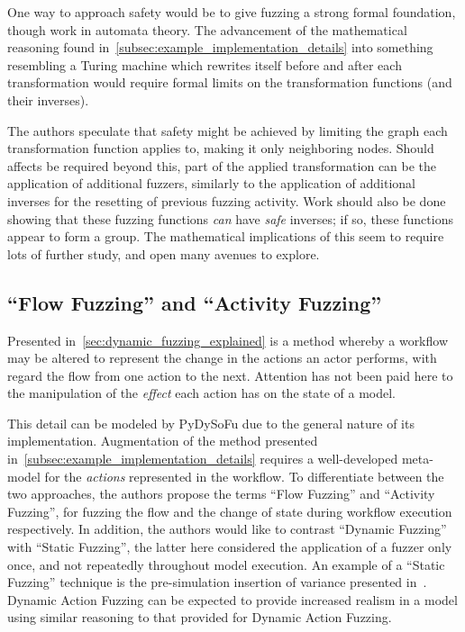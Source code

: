 \documentclass[12pt]{llncs}  %
\begin{document}
One way to approach safety would be to give fuzzing a strong formal foundation,
though work in automata theory. The advancement of the mathematical reasoning
found in~\cref{subsec:example_implementation_details} into something resembling
a Turing machine which rewrites itself before and after each transformation
would require formal limits on the transformation functions (and their
inverses).

The authors speculate that safety might be achieved by limiting the graph each
transformation function applies to, making it only neighboring nodes. Should
affects be required beyond this, part of the applied transformation can be the
application of additional fuzzers, similarly to the application of additional
inverses for the resetting of previous fuzzing activity. Work should also be
done showing that these fuzzing functions \emph{can} have \emph{safe} inverses;
if so, these functions appear to form a group. The mathematical implications of
this seem to require lots of further study, and open many avenues to explore.
\par

\subsection{``Flow Fuzzing'' and ``Activity Fuzzing''}
Presented in~\cref{sec:dynamic_fuzzing_explained} is a method whereby a workflow
may be altered to represent the change in the actions an actor performs, with
regard the flow from one action to the next. Attention has not been paid here to
the manipulation of the \emph{effect} each action has on the state of a model.
\par

This detail can be modeled by PyDySoFu due to the general nature of its
implementation. Augmentation of the method presented
in~\cref{subsec:example_implementation_details} requires a well-developed
meta-model for the \emph{actions} represented in the workflow. To differentiate
between the two approaches, the authors propose the terms ``Flow Fuzzing'' and
``Activity Fuzzing'', for fuzzing the flow and the change of state during
workflow execution respectively. In addition, the authors would like to contrast
``Dynamic Fuzzing'' with ``Static Fuzzing'', the latter here considered the
application of a fuzzer only once, and not repeatedly throughout model
execution. An example of a ``Static Fuzzing'' technique is the pre-simulation
insertion of variance presented in~\cite{pourmasoumi2015business}. Dynamic
Action Fuzzing can be expected to provide increased realism in a model using
similar reasoning to that provided for Dynamic Action Fuzzing.
\par
\end{document}
